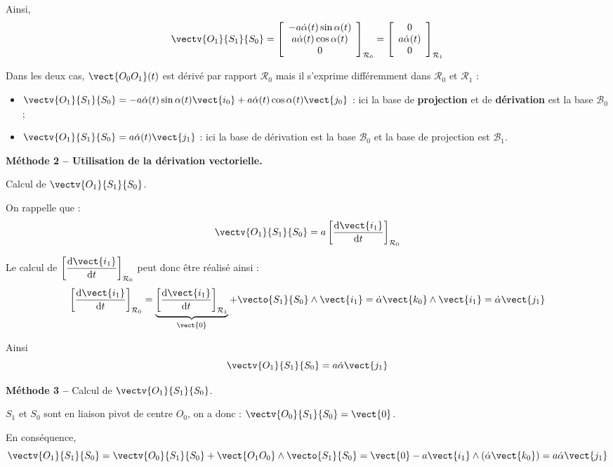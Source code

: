 \begin{multicols}{2}
\begin{corrige}
Ainsi,
$$
\vectv{O_1}{S_1}{S_0} 
= \left[\begin{array}{c} 
-a\dot{\alpha}(t)\sin\alpha(t) \\
a \dot{\alpha}(t)\cos\alpha(t) \\
0 \end{array}\right]_{\mathcal{R}_0}
=\left[\begin{array}{c} 0 \\ a\dot{\alpha}(t) \\ 0\end{array}\right]_{\mathcal{R}_1}
$$

Dans les deux cas, $\vect{O_0O_1}(t)$ est dérivé par rapport $\mathcal{R}_0$ mais il s'exprime différemment dans $\mathcal{R}_0$ et $\mathcal{R}_1$ :
\begin{itemize}
\item $\vectv{O_1}{S_1}{S_0} = -a\dot{\alpha}(t)\sin\alpha(t) \vect{i_0}   + a\dot{\alpha}(t) \cos\alpha(t) \vect{j_0}$ : ici la base de \textbf{projection} et de \textbf{dérivation} est la base $\mathcal{B}_0$;
\item $\vectv{O_1}{S_1}{S_0} = a\dot{\alpha}(t)\vect{j_1}$ : ici la base de dérivation est la base $\mathcal{B}_0$ et la base de projection est $\mathcal{B}_1$.
\end{itemize}


\textbf{Méthode 2 -- Utilisation de la dérivation vectorielle.}

Calcul de $\vectv{O_1}{S_1}{S_0}$.

On rappelle que :
$$
\vectv{O_1}{S_1}{S_0} 
= a \left[\dfrac{\text{d}  \vect{i_1} }{\text{d}t}\right]_{\mathcal{R}_0}
$$

Le calcul de $\left[\dfrac{\text{d}  \vect{i_1} }{\text{d}t}\right]_{\mathcal{R}_0}$ peut donc être réalisé ainsi : 
$$ 
\left[\dfrac{\text{d}  \vect{i_1} }{\text{d}t}\right]_{\mathcal{R}_0} = 
\underbrace{\left[\dfrac{\text{d}  \vect{i_1} }{\text{d}t}\right]_{\mathcal{R}_1}}_{\vect{0}} + \vecto{S_1}{S_0}\wedge \vect{i_1}
=\dot{\alpha}\vect{k_0}  \wedge \vect{i_1}
=\dot{\alpha} \vect{j_1}
$$

Ainsi 
$$
\vectv{O_1}{S_1}{S_0} 
= a \dot{\alpha} \vect{j_1}
$$

\textbf{Méthode 3 -- }
Calcul de $\vectv{O_1}{S_1}{S_0}$.

$S_1$ et $S_0$ sont en liaison pivot de centre $O_0$, on a donc :  $\vectv{O_0}{S_1}{S_0}=\vect{0}$.

En conséquence, 
$$
\vectv{O_1}{S_1}{S_0} = \vectv{O_0}{S_1}{S_0} + \vect{O_1O_0}\wedge   \vecto{S_1}{S_0} = \vect{0} - a \vect{i_1} \wedge \left( \dot{\alpha}\vect{k_0} \right)
=a \dot{\alpha}\vect{j_1}
$$


\end{corrige}
\end{multicols}

